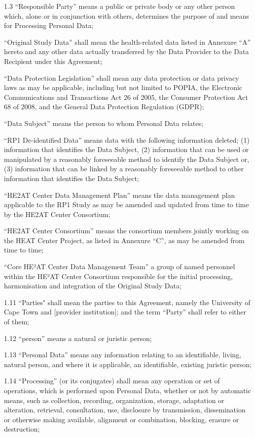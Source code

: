 \documentclass[12pt,letterpaper]{article}
\begin{document}
1.3	“Responsible Party” means a public or private body or any other person which, alone or in conjunction with others, determines the purpose of and means for Processing Personal Data;

“Original Study Data” shall mean the health-related data listed in Annexure “A” hereto and any other data actually transferred by the Data Provider to the Data Recipient under this Agreement;

“Data Protection Legislation” shall mean any data protection or data privacy laws as may be applicable, including but not limited to POPIA, the Electronic Communications and Transactions Act 26 of 2005, the Consumer Protection Act 68 of 2008, and the General Data Protection Regulation (GDPR);

“Data Subject” means the person to whom Personal Data relates;

“RP1 De-identified Data” means data with the following information deleted; (1) information that identifies the Data Subject, (2) information that can be used or manipulated by a reasonably foreseeable method to identify the Data Subject or, (3) information that can be linked by a reasonably foreseeable method to other information that identifies the Data Subject;

“HE2AT Center Data Management Plan” means the data management plan applicable to the RP1 Study as may be amended and updated from time to time by the HE2AT Center Consortium;

“HE2AT Center Consortium” means the consortium members jointly working on the HEAT Center Project, as listed in Annexure “C”, as may be amended from time to time;

“Core HE²AT Center Data Management Team” a group of named personnel within the HE²AT Center Consortium responsible for the initial processing, harmonisation and integration of the Original Study Data;

1.11	“Parties" shall mean the parties to this Agreement, namely the University of Cape Town and [provider institution]; and the term “Party” shall refer to either of them;

1.12	“person” means a natural or juristic person;

1.13	“Personal Data” means any information relating to an identifiable, living, natural person, and where it is applicable, an identifiable, existing juristic person;

1.14	“Processing” (or its conjugates) shall mean any operation or set of operations, which is performed upon Personal Data, whether or not by automatic means, such as collection, recording, organization, storage, adaptation or alteration, retrieval, consultation, use, disclosure by transmission, dissemination or otherwise making available, alignment or combination, blocking, erasure or destruction;
\end{document}

